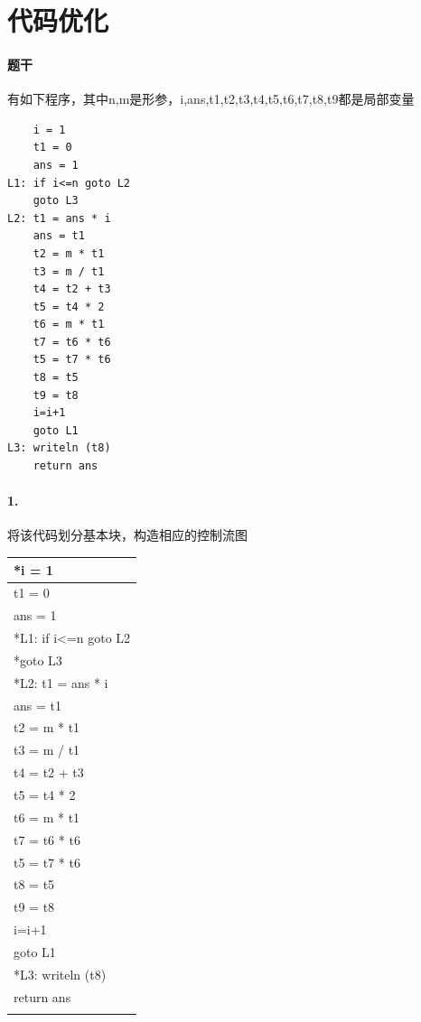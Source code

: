 \documentclass[UTF8]{ctexart} %
\begin{document}
\section{代码优化}

\paragraph{题干} 有如下程序，其中n,m是形参，i,ans,t1,t2,t3,t4,t5,t6,t7,t8,t9都是局部变量

\begin{lstlisting}
    i = 1
    t1 = 0
    ans = 1
L1: if i<=n goto L2
    goto L3
L2: t1 = ans * i
    ans = t1
    t2 = m * t1
    t3 = m / t1
    t4 = t2 + t3
    t5 = t4 * 2
    t6 = m * t1
    t7 = t6 * t6
    t5 = t7 * t6
    t8 = t5
    t9 = t8
    i=i+1
    goto L1
L3: writeln (t8)
    return ans
\end{lstlisting}

\paragraph{1.} 将该代码划分基本块，构造相应的控制流图

\begin{table}[H]
    \centering
    \begin{tabular}{|p{4cm}<{\centering}|}
        \hdashline
        *i = 1               \\
        \hline
        t1 = 0               \\
        \hline
        ans = 1              \\
        \hdashline
        *L1: if i<=n goto L2 \\
        \hdashline
        *goto L3             \\
        \hdashline
        *L2: t1 = ans * i    \\
        \hline
        ans = t1             \\
        \hline
        t2 = m * t1          \\
        \hline
        t3 = m / t1          \\
        \hline
        t4 = t2 + t3         \\
        \hline
        t5 = t4 * 2          \\
        \hline
        t6 = m * t1          \\
        \hline
        t7 = t6 * t6         \\
        \hline
        t5 = t7 * t6         \\
        \hline
        t8 = t5              \\
        \hline
        t9 = t8              \\
        \hline
        i=i+1                \\
        \hline
        goto L1              \\
        \hdashline
        *L3: writeln (t8)    \\
        \hline
        return ans           \\
        \hdashline
    \end{tabular}
\end{table}
\end{document}
